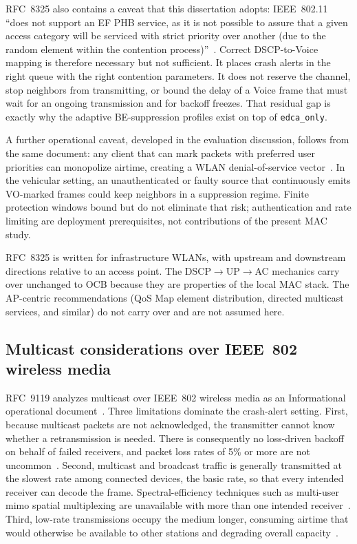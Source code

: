 RFC~8325 also contains a caveat that this dissertation adopts: IEEE~802.11 ``does not support an EF PHB service, as it is not possible to assure that a given access category will be serviced with strict priority over another (due to the random element within the contention process)''~\cite{RFC8325_WiFi_QoS}.
Correct DSCP-to-Voice mapping is therefore necessary but not sufficient.
It places crash alerts in the right queue with the right contention parameters.
It does not reserve the channel, stop neighbors from transmitting, or bound the delay of a Voice frame that must wait for an ongoing transmission and for backoff freezes.
That residual gap is exactly why the adaptive BE-suppression profiles exist on top of \texttt{edca\_only}.

A further operational caveat, developed in the evaluation discussion, follows from the same document: any client that can mark packets with preferred user priorities can monopolize airtime, creating a WLAN denial-of-service vector~\cite{RFC8325_WiFi_QoS}.
In the vehicular setting, an unauthenticated or faulty source that continuously emits VO-marked frames could keep neighbors in a suppression regime.
Finite protection windows bound but do not eliminate that risk; authentication and rate limiting are deployment prerequisites, not contributions of the present MAC study.

RFC~8325 is written for infrastructure WLANs, with upstream and downstream directions relative to an access point.
The DSCP$\rightarrow$UP$\rightarrow$AC mechanics carry over unchanged to OCB because they are properties of the local MAC stack.
The AP-centric recommendations (QoS Map element distribution, directed multicast services, and similar) do not carry over and are not assumed here.

\subsection{Multicast considerations over IEEE~802 wireless media}
\label{sec:bg:multicast}

RFC~9119 analyzes multicast over IEEE~802 wireless media as an Informational operational document~\cite{RFC9119_Multicast_IEEE802_Wireless}.
Three limitations dominate the crash-alert setting.
First, because multicast packets are not acknowledged, the transmitter cannot know whether a retransmission is needed.
There is consequently no loss-driven backoff on behalf of failed receivers, and packet loss rates of 5\% or more are not uncommon~\cite{RFC9119_Multicast_IEEE802_Wireless}.
Second, multicast and broadcast traffic is generally transmitted at the slowest rate among connected devices, the basic rate, so that every intended receiver can decode the frame.
Spectral-efficiency techniques such as multi-user \gls{mimo} spatial multiplexing are unavailable with more than one intended receiver~\cite{RFC9119_Multicast_IEEE802_Wireless}.
Third, low-rate transmissions occupy the medium longer, consuming airtime that would otherwise be available to other stations and degrading overall capacity~\cite{RFC9119_Multicast_IEEE802_Wireless}.

